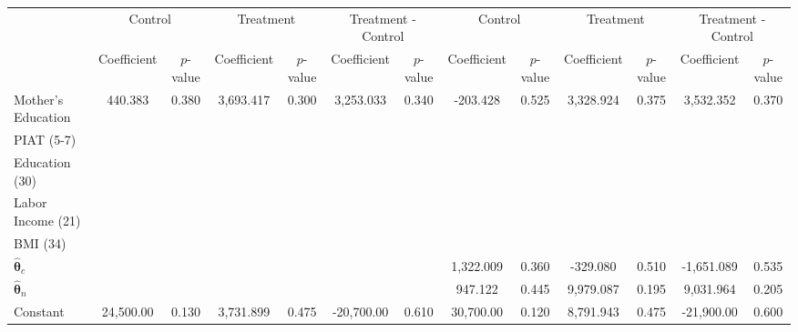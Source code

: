 \begin{tabular}{lcccccccccccc} \toprule
&\multicolumn{2}{c}{Control} & \multicolumn{2}{c}{Treatment} & \multicolumn{2}{c}{Treatment - Control} & \multicolumn{2}{c}{Control} & \multicolumn{2}{c}{Treatment} & \multicolumn{2}{c}{Treatment - Control} \\
 & Coefficient  & $p$-value  & Coefficient  & $p$-value & Coefficient  & $p$-value  & Coefficient  & $p$-value  & Coefficient  & $p$-value  & Coefficient  & $p$-value \\ \midrule
Mother's Education &   440.383 &     0.380 &  3,693.417 &     0.300 &  3,253.033 &     0.340 &  -203.428 &     0.525 &  3,328.924 &     0.375 &  3,532.352 &     0.370 \\  
PIAT (5-7) &         &         &         &         &         &         &         &         &         &         &         &         \\
Education (30) &         &         &         &         &         &         &         &         &         &         &         &         \\
Labor Income (21) &         &         &         &         &         &         &         &         &         &         &         &         \\
BMI (34) &         &         &         &         &         &         &         &         &         &         &         &         \\
$\hat{\bm{\theta}}_{c}$ &         &         &         &         &         &         &  1,322.009 &     0.360 &  -329.080 &     0.510 & -1,651.089 &     0.535 \\  
$\hat{\bm{\theta}}_{n}$ &         &         &         &         &         &         &   947.122 &     0.445 &  9,979.087 &     0.195 &  9,031.964 &     0.205 \\  
Constant  & 24,500.00 &     0.130 &  3,731.899 &     0.475 & -20,700.00 &     0.610 & 30,700.00 &     0.120 &  8,791.943 &     0.475 & -21,900.00 &     0.600 \\  
\bottomrule \end{tabular}
